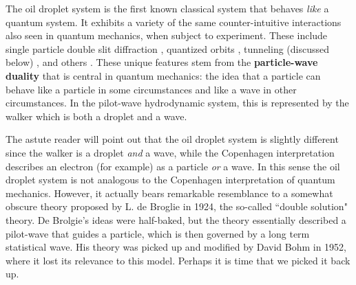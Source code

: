 The oil droplet system is the first known classical system that behaves \textit{like} a quantum system. It exhibits a variety of the same counter-intuitive interactions also seen in quantum mechanics, when subject to experiment. These include single particle double slit diffraction , quantized orbits , tunneling (discussed below) , and others . These unique features stem from the \textbf{particle-wave duality} that is central in quantum mechanics: the idea that a particle can behave like a particle in some circumstances and like a wave in other circumstances. In the pilot-wave hydrodynamic system, this is represented by the walker which is both a droplet and a wave.

The astute reader will point out that the oil droplet system is slightly different since the walker is a droplet \textit{and} a wave, while the Copenhagen interpretation describes an electron (for example) as a particle \textit{or} a wave. In this sense the oil droplet system is not analogous to the Copenhagen interpretation of quantum mechanics. However, it actually bears remarkable resemblance to a somewhat obscure theory proposed by L. de Broglie in 1924, the so-called ``double solution" theory. De Brolgie's ideas were half-baked, but the theory essentially described a pilot-wave that guides a particle, which is then governed by a long term statistical wave. His theory was picked up and modified by David Bohm in 1952, where it lost its relevance to this model. Perhaps it is time that we picked it back up. 






